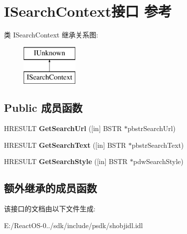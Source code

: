\hypertarget{interface_i_search_context}{}\section{I\+Search\+Context接口 参考}
\label{interface_i_search_context}
类 I\+Search\+Context 继承关系图\+:\begin{figure}[H]
\begin{center}
\leavevmode
\includegraphics[height=2.000000cm]{interface_i_search_context}
\end{center}
\end{figure}
\subsection*{Public 成员函数}
\begin{DoxyCompactItemize}
\item 
\mbox{\label{interface_i_search_context_a1eceb15c266dccc03d7000b8a08cffa7}} 
H\+R\+E\+S\+U\+LT {\bfseries Get\+Search\+Url} (\mbox{[}in\mbox{]} B\+S\+TR $\ast$pbstr\+Search\+Url)
\item 
\mbox{\label{interface_i_search_context_a4d6ee6a48a8efbae4b0b971be106fb05}} 
H\+R\+E\+S\+U\+LT {\bfseries Get\+Search\+Text} (\mbox{[}in\mbox{]} B\+S\+TR $\ast$pbstr\+Search\+Text)
\item 
\mbox{\label{interface_i_search_context_a078170ccd01b79b55be152856926834a}} 
H\+R\+E\+S\+U\+LT {\bfseries Get\+Search\+Style} (\mbox{[}in\mbox{]} B\+S\+TR $\ast$pdw\+Search\+Style)
\end{DoxyCompactItemize}
\subsection*{额外继承的成员函数}


该接口的文档由以下文件生成\+:\begin{DoxyCompactItemize}
\item 
E\+:/\+React\+O\+S-\/0../sdk/include/psdk/shobjidl.\+idl\end{DoxyCompactItemize}
